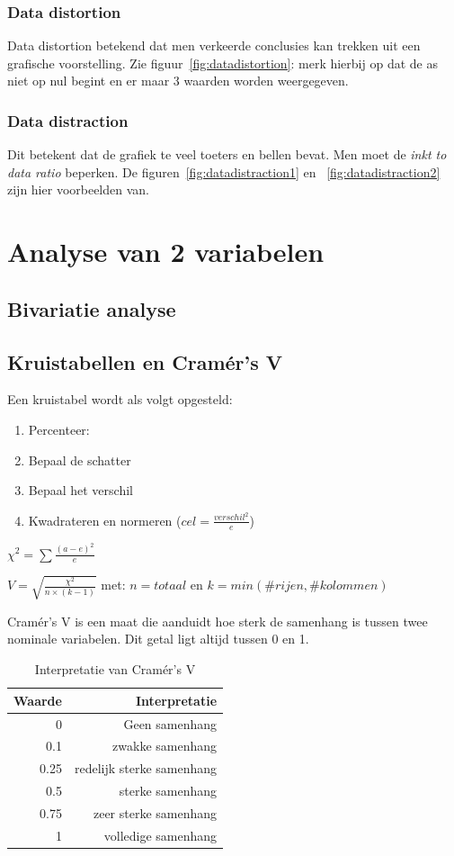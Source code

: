 \documentclass[a4paper,12pt]{article}
\begin{document}
\subsubsection{Data distortion}
Data distortion betekend dat men verkeerde conclusies kan trekken uit een grafische voorstelling.
Zie figuur~\ref{fig:datadistortion}: merk hierbij op dat de as niet op nul begint en er maar 3 waarden worden weergegeven.

\subsubsection{Data distraction}
Dit betekent dat de grafiek te veel toeters en bellen bevat.
Men moet de \textit{inkt to data ratio} beperken.
De figuren~\ref{fig:datadistraction1} en ~\ref{fig:datadistraction2} zijn hier voorbeelden van.

\section{Analyse van 2 variabelen}
\subsection{Bivariatie analyse}

\subsection{Kruistabellen en Cramér's V}
Een kruistabel wordt als volgt opgesteld:
\begin{enumerate}
\item	Percenteer:
		\tab{}
\item	Bepaal de schatter 
\item	Bepaal het verschil
\item	Kwadrateren en normeren
		\tab($cel = \frac{verschil^2}{e}$)
\end{enumerate}
$\chi^2=\sum\frac{(a-e)^2}{e}$ 

$V = \sqrt{\frac{\chi^2}{n \times (k-1)}}$
met: {$n = totaal$ en $k = min(\#rijen,\#kolommen)$}

Cramér's V is een maat die aanduidt hoe sterk de samenhang is tussen twee nominale variabelen.
Dit getal ligt altijd tussen 0 en 1.
\begin{table}[H]
\centering
\begin{tabular}{|r|r|}
\hline
Waarde & Interpretatie\\
\hline
0 & Geen samenhang\\
0.1 & zwakke samenhang\\
0.25 & redelijk sterke samenhang\\
0.5 & sterke samenhang\\
0.75 & zeer sterke samenhang\\
1 & volledige samenhang\\
\hline
\end{tabular}
\caption{Interpretatie van Cramér's V}
\label{tab:interpretatieCramersV}
\end{table}
\end{document}
